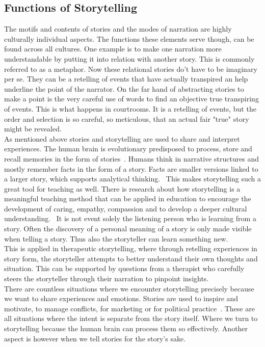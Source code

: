 \subsection{Functions of Storytelling}
The motifs and contents of stories and the modes of narration are highly culturally individual aspects. The functions these elements serve though, can be found across all cultures. One example is to make one narration more understandable by putting it into relation with another story. This is commonly referred to as a metaphor. Now these relational stories do't have to be imaginary per se. They can be a retelling of events that have actually transpired an help underline the point of the narrator. On the far hand of abstracting stories to make a point is the very careful use of words to find an objective true transpiring of events. This is what happens in courtrooms. It is a retelling of events, but the order and selection is so careful, so meticulous, that an actual fair "true" story might be revealed.~\cite{Rigney1992}\\
As mentioned above stories and storytelling are used to share and interpret experiences. The human brain is evolutionary predisposed to process, store and recall memories in the form of stories~\cite{Wyer2014}. Humans think in narrative structures and mostly remember facts in the form of a story. Facts are smaller versions linked to a larger story, which supports analytical thinking.~\cite{Connelly1990} This makes storytelling such a great tool for teaching as well. There is research about how storytelling is a meaningful teaching method that can be applied in education to encourage the development of caring, empathy, compassion and to develop a deeper cultural understanding.~\cite{Davidson2004} It is not event solely the listening person who is learning from a story. Often the discovery of a personal meaning of a story is only made visible when telling a story. Thus also the storyteller can learn something new.~\cite{Doty2003}\\
This is applied in therapeutic storytelling, where through retelling experiences in story form, the storyteller attempts to better understand their own thoughts and situation. This can be supported by questions from a therapist who carefully steers the storyteller through their narration to pinpoint insights.~\cite{Lawless2001}\\
There are countless situations where we encounter storytelling precisely because we want to share experiences and emotions. Stories are used to inspire and motivate, to manage conflicts, for marketing or for political practice~\cite{Jameson2001}. These are all situations where the intent is separate from the story itself. Where we turn to storytelling because the human brain can process them so effectively. Another aspect is however when we tell stories for the story's sake.


